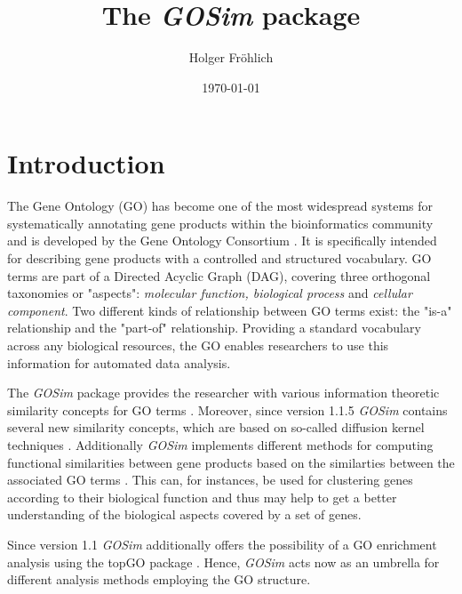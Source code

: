 \documentclass[12pt,a4paper]{article}
\begin{document}
\author{Holger Fr\"ohlich}

\title{The \emph{GOSim} package}
\date{\today}
\maketitle

\section{Introduction}

The Gene Ontology (GO) has become one of the most widespread systems for systematically annotating gene products within the bioinformatics community and is developed by the Gene Ontology Consortium \cite{GOConsortium04}. It is specifically intended for describing gene products with a controlled and structured vocabulary. GO terms are part of a Directed Acyclic Graph (DAG), covering three orthogonal taxonomies or "aspects": \emph{molecular function, biological process} and \emph{cellular component}. Two different kinds of relationship between GO terms exist: the "is-a" relationship and the "part-of" relationship.
Providing a standard vocabulary across any biological resources, the GO enables researchers to use this information for automated data analysis.

The \emph{GOSim} package \cite{Froehlich2007GOSim} provides the researcher with various information theoretic similarity concepts for GO terms \cite{Resnik95, Resnik99, Lin98, Jiang98, Lord03, Couto2003FuSSiMeg, Couto2005GraSM}. Moreover, since version 1.1.5 \emph{GOSim} contains several new similarity concepts, which are based on so-called diffusion kernel techniques \cite{Lerman2007ManifoldEmbedding}.  Additionally \emph{GOSim} implements different methods for computing functional similarities between gene products based on the similarties between the associated GO terms \cite{FroeGO05, FroeSpeerGOKer06, Schlicker2006GOFuncSim, Lerman2007ManifoldEmbedding, Pozo2008GOFuncSim}. This can, for instances, be used for clustering genes according to their biological function \cite{FroeGO05, FroeSpeerGOKer06} and thus may help to get a better understanding of the biological aspects covered by a set of genes. 

Since version 1.1 \emph{GOSim} additionally offers the possibility of a GO enrichment analysis using the topGO package \cite{Alexa2006topGO}. Hence, \emph{GOSim} acts now as an umbrella for different analysis methods employing the GO structure.
\end{document}
